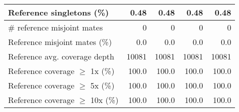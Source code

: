 \documentclass[12pt,a4paper]{article}
\begin{document}
\begin{table}[ht]
\begin{center}
\begin{tabular}{|l*{4}{|r}|}
Reference singletons (\%) & 0.48 & 0.48 & 0.48 & 0.48 \\ \hline
\# reference misjoint mates & 0 & 0 & 0 & 0 \\ \hline
Reference misjoint mates (\%) & 0.0 & 0.0 & 0.0 & 0.0 \\ \hline
Reference avg. coverage depth & 10081 & 10081 & 10081 & 10081 \\ \hline
Reference coverage $\geq$ 1x (\%) & 100.0 & 100.0 & 100.0 & 100.0 \\ \hline
Reference coverage $\geq$ 5x (\%) & 100.0 & 100.0 & 100.0 & 100.0 \\ \hline
Reference coverage $\geq$ 10x (\%) & 100.0 & 100.0 & 100.0 & 100.0 \\ \hline
\end{tabular}
\end{center}
\end{table}
\end{document}
